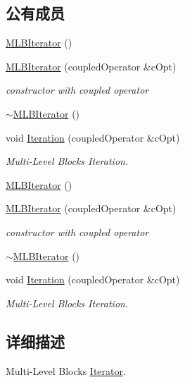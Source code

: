 \subsection*{公有成员}
\begin{DoxyCompactItemize}
\item 
\hyperlink{classMLBIterator_a211e06e04c43bf4df46f1d45189fa271}{MLBIterator} ()
\item 
\hyperlink{classMLBIterator_a3ebc135eabdafb635d1b07b7138d5312}{MLBIterator} (coupledOperator \&cOpt)
\begin{DoxyCompactList}\small\item\em constructor with coupled operator \item\end{DoxyCompactList}\item 
\hyperlink{classMLBIterator_adf1f2571a69820fefe660ad605b4378b}{$\sim$MLBIterator} ()
\item 
void \hyperlink{classMLBIterator_a05e27d9c7ccc97d8e340a9f7ecba14ff}{Iteration} (coupledOperator \&cOpt)
\begin{DoxyCompactList}\small\item\em Multi-\/Level Blocks Iteration. \item\end{DoxyCompactList}\item 
\hyperlink{classMLBIterator_a211e06e04c43bf4df46f1d45189fa271}{MLBIterator} ()
\item 
\hyperlink{classMLBIterator_a3ebc135eabdafb635d1b07b7138d5312}{MLBIterator} (coupledOperator \&cOpt)
\begin{DoxyCompactList}\small\item\em constructor with coupled operator \item\end{DoxyCompactList}\item 
\hyperlink{classMLBIterator_adf1f2571a69820fefe660ad605b4378b}{$\sim$MLBIterator} ()
\item 
void \hyperlink{classMLBIterator_a05e27d9c7ccc97d8e340a9f7ecba14ff}{Iteration} (coupledOperator \&cOpt)
\begin{DoxyCompactList}\small\item\em Multi-\/Level Blocks Iteration. \item\end{DoxyCompactList}\end{DoxyCompactItemize}


\subsection{详细描述}
Multi-\/Level Blocks \hyperlink{classIterator}{Iterator}. 

